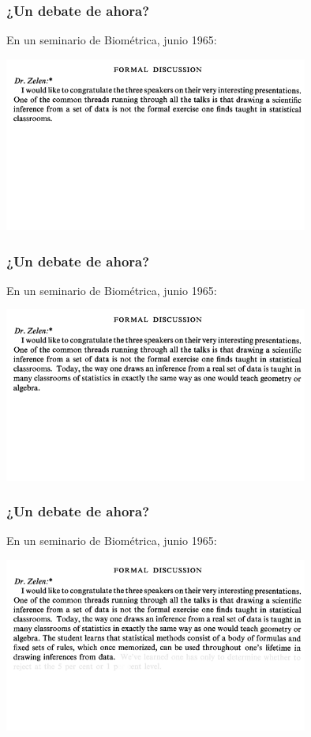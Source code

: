 \documentclass[9pt]{beamer}
\begin{document}
\begin{frame}
  \frametitle{¿Un debate de ahora?}
  \begin{overlayarea}{\textwidth}{\textheight}
  En un seminario de Biométrica, junio 1965:
  \pause
  \begin{center}
    \includegraphics[width=10cm]{images/cutler_1}
  \end{center}
\end{overlayarea}
\end{frame}
\begin{frame}
    \begin{overlayarea}{\textwidth}{\textheight}
  \frametitle{¿Un debate de ahora?}
  En un seminario de Biométrica, junio 1965:
  \begin{center}
    \includegraphics[width=10cm]{images/cutler_2}
  \end{center}
\end{overlayarea}
\end{frame}

\begin{frame}
  \frametitle{¿Un debate de ahora?}
    \begin{overlayarea}{\textwidth}{\textheight}
  En un seminario de Biométrica, junio 1965:
  \begin{center}
    \includegraphics[width=10cm]{images/cutler_2-5}
  \end{center}
\end{overlayarea}
\end{frame}
\end{document}
